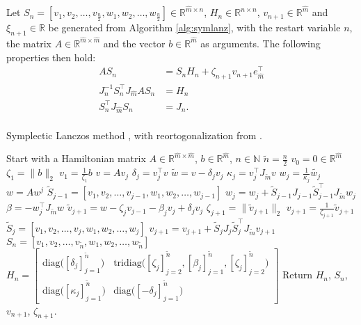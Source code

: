 \noindent Let $S_n = [v_1,v_2,\dots ,v_{\frac{n}{2}}, w_1,w_2,\dots,w_{\frac{n}{2}}] \in \mathbb{R}^{\hat{m} \times n}$, $H_n \in \mathbb{R}^{n \times n}$, $v_{n+1} \in \mathbb{R}^{\hat{m}}$ and $\xi_{n+1} \in \mathbb{R}$ be generated from Algorithm \ref{alg:symlanz}, with the restart variable $n$, the matrix $A \in \mathbb{R}^{\hat{m} \times \hat{m}}$ and the vector $b \in \mathbb{R}^{\hat{m}}$ as arguments. The following properties then hold:
\begin{equation}
\begin{aligned}
AS_n &= S_n H_n + \zeta_{n+1} v_{n+1} e_{\hat{m}}^\top\\
J_{n}^{-1} S_n^\top J_{\hat{m}} A S_n &= H_n \\
S_n^{\top} J_{\hat{m}} S_n &= J_{n}.\\
\label{eqn:propS}
\end{aligned}
\end{equation}
\begin{algorithm} \caption{Symplectic Lanczos method \cite{SLM}, with reortogonalization from \cite{SLMO}. } \label{alg:symlanz}
\begin{algorithmic}
\STATE Start with a Hamiltonian matrix $A \in \mathbb{R}^{\hat{m} \times \hat{m}}$, $b \in \mathbb{R}^{\hat{m}}$, $n \in \mathbb{N}$
\STATE $\tilde{n} = \frac{n}{2}$
\STATE $v_0= 0 \in \mathbb{R}^{\hat{m}}$
\STATE $\zeta_1 = \| b\|_2$
\STATE $v_1= \frac{1}{\zeta_1}  b$
	\STATE $v = A v_j$
	\STATE $\delta_j =  v_j^\top v$
	\STATE $\tilde{w} = v-\delta_j v_j$
	\STATE $\kappa_j = v_j^\top J_{\tilde{m}} v $
	\STATE $w_j = \frac{1}{\kappa_j} \tilde{w_j}$
	\STATE $w = A w^j$
	\STATE $ \tilde{S}_{j-1} = [v_1,v_2,\dots,v_{j-1},w_1,w_2,\dots,w_{j-1}] $
	\STATE $ w_j = w_j + \tilde{S}_{j-1}J_{j-1} \tilde{S}_{j-1}^\top J_{\tilde{m}} w_j $
	\STATE $\beta = -w_j^\top J_{\tilde{m}} w$
	\STATE $\tilde{v}_{j+1} = w - \zeta_j v_{j-1} - \beta_j v_j + \delta_j v_j$
	\STATE $ \zeta_{j+1} = \|\tilde{v}_{j+1} \|_2 $
	\STATE $ v_{j+1} = \frac{1}{\zeta_{j+1}} \tilde{v}_{j+1} $
	\STATE $ \tilde{S}_j = [v_1,v_2,\dots,v_{j},w_1,w_2,\dots,w_{j}] $
	\STATE $ v_{j+1} = v_{j+1} + \tilde{S}_j J_j \tilde{S}_j^\top J_{\tilde{m}} v_{j+1} $
\ENDFOR
\STATE $S_n = [v_1,v_2,\dots,v_{\tilde{n}},w_1,w_2,\dots,w_{\tilde{n}}]$
\STATE $H_n = \begin{bmatrix}
\text{diag} \big( [\delta_j]^{\tilde{n}}_{j=1} \big) & \text{tridiag}\big( [\zeta_j]_{j=2}^{\tilde{n}},[\beta_j]_{j=1}^{\tilde{n}},[\zeta_j]_{j=2}^{\tilde{n}} \big) \\
\text{diag} \big( [\kappa_j]^{\tilde{n}}_{j=1} \big) & \text{diag} \big( [-\delta_j]^{\tilde{n}}_{j=1} \big)
\end{bmatrix} $
\STATE Return $H_n$, $S_n$, $v_{n+1}$, $\zeta_{n+1}$.
\end{algorithmic}
\end{algorithm}

